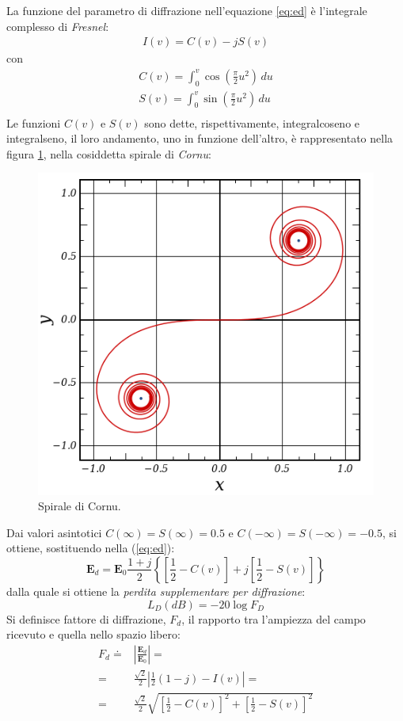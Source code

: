 La funzione del parametro di diffrazione nell'equazione \ref{eq:ed} è l'integrale complesso di \emph{Fresnel}:
\begin{align}
\label{eq:integralefresnel}
I(v) = C(v) - jS(v)
\end{align}
con
\begin{align*}
 C(v)=\int_{0}^{v} \cos(\frac{\pi}{2}u^{2})\, du \\
 S(v)=\int_{0}^{v} \sin(\frac{\pi}{2}u^{2})\, du \\
\end{align*}
Le funzioni $C(v)$ e $S(v)$ sono dette, rispettivamente, integralcoseno e integralseno, il loro andamento, uno in funzione dell'altro,
è rappresentato nella figura \ref{img:cornu}, nella cosiddetta spirale di \emph{Cornu}:
\begin{figure}[!h]
\centering
\includegraphics[height=0.5\textwidth]{Immagini/cornu}
\caption{Spirale di Cornu.}
\label{img:cornu}
\end{figure}
Dai valori asintotici $C(\infty) = S(\infty) = 0.5$ e $C(-\infty) = S(-\infty) = -0.5$, si ottiene, sostituendo nella (\ref{eq:ed}):
\[
\mathbf{E}_{d} = \mathbf{E}_{0} \frac{1+j}{2} 
\left \{ \left [ \frac{1}{2} - C(v) \right ] + j \left [ \frac{1}{2} - S(v) \right ] \right \}
\]
dalla quale si ottiene la \emph{perdita supplementare per diffrazione}:
\[
 L_{D}(dB) = -20 \log{F_{D}}
\]
Si definisce fattore di diffrazione, $F_{d}$, il rapporto tra l'ampiezza del campo ricevuto e quella nello spazio libero:
\begin{align*}
F_{d} \doteq& \left| \frac{\mathbf{E}_{d}}{\mathbf{E}_{0}}  \right| = \\
=& \frac{\sqrt{2}}{2} \left| \frac{1}{2} (1-j) - I(v) \right| = \\
=& \frac{\sqrt{2}}{2} \sqrt{ \left [ \frac{1}{2} - C(v) \right ]^{2} + \left [ \frac{1}{2} - S(v) \right ]^{2} }
\end{align*}
